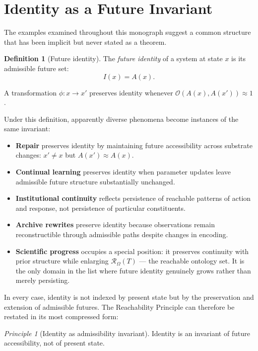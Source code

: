 \documentclass[11pt, a4paper, openany]{book}
\theoremstyle{plain}
\theoremstyle{definition}
\newtheorem{definition}[theorem]{Definition}
\theoremstyle{remark}
\newtheorem{principle}{Principle}
\begin{document}
\section{Identity as a Future Invariant}

The examples examined throughout this monograph suggest a common structure
that has been implicit but never stated as a theorem.

\begin{definition}[Future identity]
  The \emph{future identity} of a system at state $x$ is its admissible
  future set:
  \[
    I(x) = A(x).
  \]
\end{definition}

A transformation $\phi : x \to x'$ preserves identity whenever
$\mathcal{O}(A(x), A(x')) \approx 1$.

Under this definition, apparently diverse phenomena become instances of
the same invariant:

\begin{itemize}
  \item \textbf{Repair} preserves identity by maintaining future accessibility
    across substrate changes: $x' \neq x$ but $A(x') \approx A(x)$.
  \item \textbf{Continual learning} preserves identity when parameter updates
    leave admissible future structure substantially unchanged.
  \item \textbf{Institutional continuity} reflects persistence of reachable
    patterns of action and response, not persistence of particular constituents.
  \item \textbf{Archive rewrites} preserve identity because observations remain
    reconstructible through admissible paths despite changes in encoding.
  \item \textbf{Scientific progress} occupies a special position:
    it preserves continuity with prior structure while enlarging
    $\mathcal{R}_\Omega(T)$ --- the reachable ontology set.
    It is the only domain in the list where future identity genuinely grows
    rather than merely persisting.
\end{itemize}

In every case, identity is not indexed by present state but by the
preservation and extension of admissible futures.
The Reachability Principle can therefore be restated in its most compressed form:

\begin{principle}[Identity as admissibility invariant]
  Identity is an invariant of future accessibility, not of present state.
\end{principle}
\end{document}
